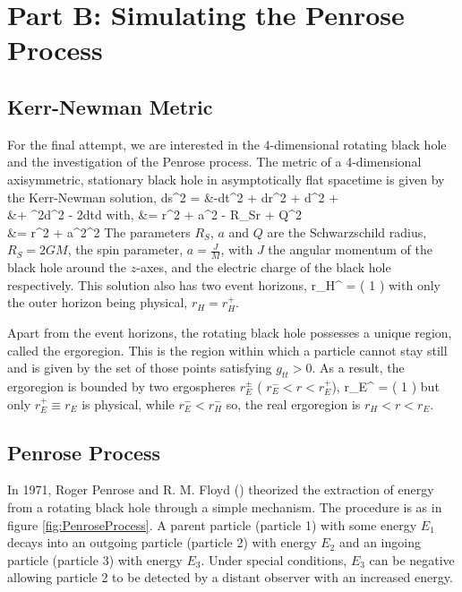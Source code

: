 \section{Part B: Simulating the Penrose Process}
\label{Sec3}

\subsection{Kerr-Newman Metric}
For the final attempt, we are interested in the 4-dimensional rotating black hole and the investigation of the Penrose process. The metric of a 4-dimensional axisymmetric, stationary black hole in asymptotically flat spacetime is given by the Kerr-Newman solution,
\be\ba\label{Metric_Kerr-Newman}
	ds^2 = &-dt^2 + \frac{\Sigma}{\Delta}dr^2 + \Sigma d\theta^2 + \\
	&+ \sin^2\theta d\phi^2 - 2dtd\phi
\ea\ee
with,
\be\ba
	\Delta &= r^2 + a^2 - R_{S}r + Q^2 \\
	\Sigma &= r^2 + a^2\cos^2\theta
\ea\ee
The parameters $R_{S}$, $a$ and $Q$ are the Schwarzschild radius, $R_{S}=2GM$, the spin parameter, $a=\frac{J}{M}$, with $J$ the angular momentum of the black hole around the $z$-axes, and the electric charge of the black hole respectively. This solution also has two event horizons,
\be
	r_{H}^{\pm} = \left( 1 \pm {} \right)
\ee
with only the outer horizon being physical, $r_{H} = r_{H}^{+}$.

Apart from the event horizons, the rotating black hole possesses a unique region, called the ergoregion. This is the region within which a particle cannot stay still and is given by the set of those points satisfying $g_{tt}>0$. As a result, the ergoregion is bounded by two ergospheres $r_{E}^{\pm}$ ( $r_{E}^{-} < r < r_{E}^{+}$),
\be
	r_{E}^{\pm} = \left( 1 \pm {}  \right)
\ee
but only $r_{E}^{+} \equiv r_{E}$ is physical, while $r_{E}^{-} < r_{H}^{-}$ so, the real ergoregion is $r_{H}<r<r_{E}$.

\subsection{Penrose Process}
In 1971, Roger Penrose and R. M. Floyd (\cite{Penrose1971}) theorized the extraction of energy from a rotating black hole through a simple mechanism. The procedure is as in figure \ref{fig:PenroseProcess}. A parent particle (particle 1) with some energy $E_1$ decays into an outgoing particle (particle 2) with energy $E_2$ and an ingoing particle (particle 3) with energy $E_3$. Under special conditions, $E_3$ can be negative allowing particle 2 to be detected by a distant observer with an increased energy.

